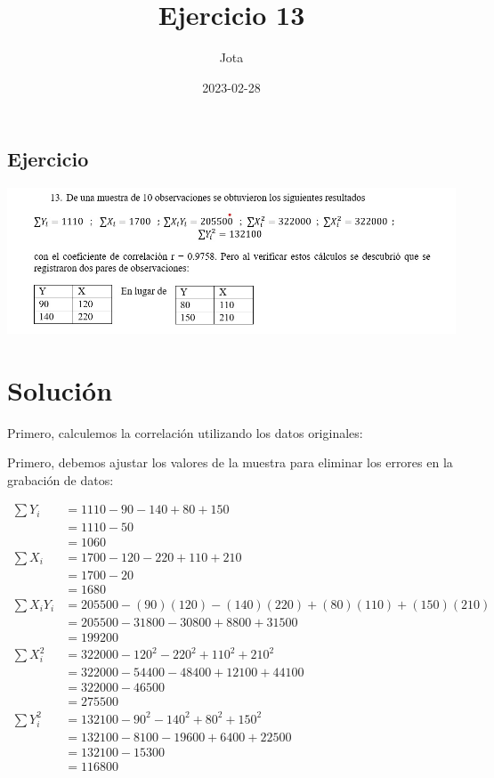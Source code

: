 \documentclass[
]{article}
\title{Ejercicio 13}
\author{Jota}
\date{2023-02-28}
\begin{document}
\maketitle

\hypertarget{ejercicio}{%
\subsection{Ejercicio}\label{ejercicio}}

\includegraphics{13.jpg}

\hypertarget{soluciuxf3n}{%
\section{Solución}\label{soluciuxf3n}}

Primero, calculemos la correlación utilizando los datos originales:

Primero, debemos ajustar los valores de la muestra para eliminar los
errores en la grabación de datos:

\[\begin{align*}
\sum Y_i &= 1110 - 90 - 140 + 80 + 150 \\
&= 1110 - 50 \\
&= 1060 \\
\sum X_i &= 1700 - 120 - 220 + 110 + 210 \\
&= 1700 - 20 \\
&= 1680 \\
\sum X_iY_i &= 205500 - (90)(120) - (140)(220) + (80)(110) + (150)(210) \\
&= 205500 - 31800 - 30800 + 8800 + 31500 \\
&= 199200 \\
\sum X_i^2 &= 322000 - 120^2 - 220^2 + 110^2 + 210^2 \\
&= 322000 - 54400 - 48400 + 12100 + 44100 \\
&= 322000 - 46500 \\
&= 275500 \\
\sum Y_i^2 &= 132100 - 90^2 - 140^2 + 80^2 + 150^2 \\
&= 132100 - 8100 - 19600 + 6400 + 22500 \\
&= 132100 - 15300 \\
&= 116800 \\
\end{align*}\]
\end{document}
